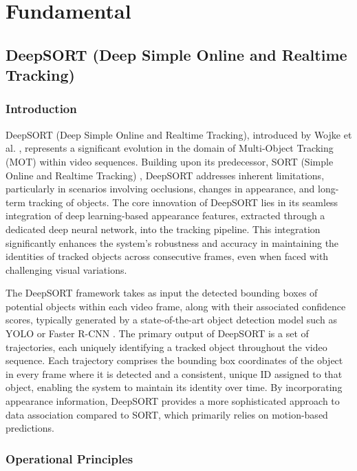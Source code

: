 \chapter{Fundamental}



\section{DeepSORT (Deep Simple Online and Realtime Tracking)}

\subsection{Introduction}

DeepSORT (Deep Simple Online and Realtime Tracking), introduced by Wojke et al. \cite{wojke2017simple}, represents a significant evolution in the domain of Multi-Object Tracking (MOT) within video sequences. Building upon its predecessor, SORT (Simple Online and Realtime Tracking) \cite{bewley2016simple}, DeepSORT addresses inherent limitations, particularly in scenarios involving occlusions, changes in appearance, and long-term tracking of objects. The core innovation of DeepSORT lies in its seamless integration of deep learning-based appearance features, extracted through a dedicated deep neural network, into the tracking pipeline. This integration significantly enhances the system's robustness and accuracy in maintaining the identities of tracked objects across consecutive frames, even when faced with challenging visual variations.

The DeepSORT framework takes as input the detected bounding boxes of potential objects within each video frame, along with their associated confidence scores, typically generated by a state-of-the-art object detection model such as YOLO \cite{redmon2016you} or Faster R-CNN \cite{ren2015faster}. The primary output of DeepSORT is a set of trajectories, each uniquely identifying a tracked object throughout the video sequence. Each trajectory comprises the bounding box coordinates of the object in every frame where it is detected and a consistent, unique ID assigned to that object, enabling the system to maintain its identity over time. By incorporating appearance information, DeepSORT provides a more sophisticated approach to data association compared to SORT, which primarily relies on motion-based predictions.

\subsection{Operational Principles}

